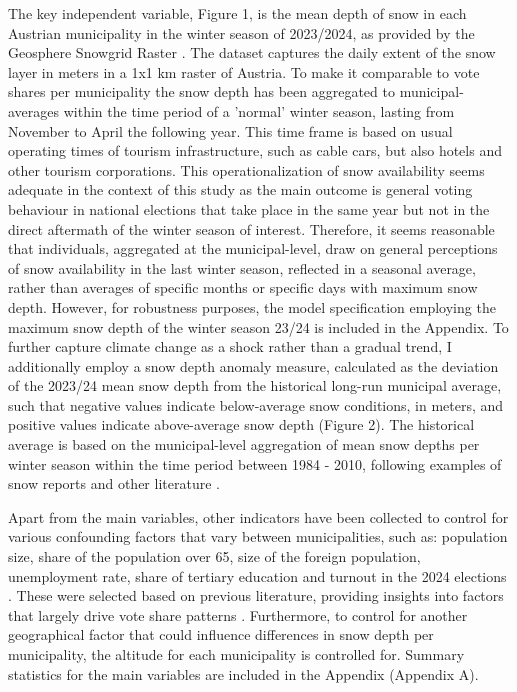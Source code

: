 \documentclass{article}
\begin{document}
The key independent variable, Figure 1, is the mean depth of snow in each Austrian municipality in the winter season of 2023/2024, as provided by the Geosphere Snowgrid Raster \parencite{Olefs2020}. The dataset captures the daily extent of the snow layer in meters in a 1x1 km raster of Austria. To make it comparable to vote shares per municipality the snow depth has been aggregated to municipal-averages within the time period of a 'normal' winter season, lasting from November to April the following year. This time frame is based on usual operating times of tourism infrastructure, such as cable cars, but also hotels and other tourism corporations. This operationalization of snow availability seems adequate in the context of this study as the main outcome is general voting behaviour in national elections that take place in the same year but not in the direct aftermath of the winter season of interest. Therefore, it seems reasonable that individuals, aggregated at the municipal-level, draw on general perceptions of snow availability in the last winter season, reflected in a seasonal average, rather than averages of specific months or specific days with maximum snow depth. However, for robustness purposes, the model specification employing the maximum snow depth of the winter season 23/24 is included in the Appendix. 
To further capture climate change as a shock rather than a gradual trend, I additionally employ a snow depth anomaly measure, calculated as the deviation of the 2023/24 mean snow depth from the historical long-run municipal average, such that negative values indicate below-average snow conditions, in meters, and positive values indicate above-average snow depth (Figure 2). The historical average is based on the municipal-level aggregation of mean snow depths per winter season within the time period between 1984 - 2010, following examples of snow reports and other literature . 

Apart from the main variables, other indicators have been collected to control for various confounding factors that vary between municipalities, such as: population size, share of the population over 65, size of the foreign population, unemployment rate, share of tertiary education and turnout in the 2024 elections \parencite{statistikaustria2025}. These were selected based on previous literature, providing insights into factors that largely drive vote share patterns \parencite{hooghe2026, ennserjedenastik2016}. 
Furthermore, to control for another geographical factor that could influence differences in snow depth per municipality, the altitude for each municipality is controlled for.
Summary statistics for the main variables are included in the Appendix (Appendix A).
\end{document}
